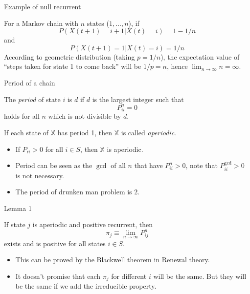 \documentclass[mathserif]{beamer}
\begin{document}
\begin{frame}{Example of null recurrent}
	\begin{example}
		For a Markov chain with $n$ states ($1,\ldots,n$), if 
		\[
		P(X(t+1)=i+1|X(t)=i) = 1-1/n
		\]
		and
		\[
		P(X(t+1)=1|X(t)=i) = 1/n
		\]
		According to geometric distribution (taking $p = 1/n$), the expectation value of ``steps taken for state 1 to come back'' will be $1/p = n$, hence $\lim_{n\to\infty} n = \infty$.
	\end{example}
\end{frame}

\begin{frame}{Period of a chain}
	\begin{definition}
		The \textit{period} of state $i$ is $d$ if $d$ is the largest integer such that
		\[
		P^n_{ii} = 0
		\]
		holds for all $n$ which is not divisible by $d$.
	\end{definition}
	\begin{definition}
		If each state of $\mathbb{X}$ has period 1, then $\mathbb{X}$ is called \textit{aperiodic}.
	\end{definition}
	\begin{itemize}
		\item If $P_{ii} > 0$ for all $i \in S$, then $\mathbb{X}$ is aperiodic.
		\item Period can be seen as the $\gcd$ of all $n$ that have $P^n_{ii} > 0$, note that $P^{\gcd}_{ii} > 0$ is not necessary.
		\item The period of drunken man problem is 2.
	\end{itemize}
\end{frame}

\begin{frame}{Lemma 1}
	\begin{lemma}
		If state $j$ is aperiodic and positive recurrent, then
		\[
		\pi_j \equiv \lim_{n \to \infty} P^n_{ij}
		\]
		exists and is positive for all states $i \in S$.
	\end{lemma}
	\begin{itemize}
		\item This can be proved by the Blackwell theorem in Renewal theory.
		\item It doesn't promise that each $\pi_j$ for different $i$ will be the same.
			But they will be the same if we add the irreducible property.
	\end{itemize}
\end{frame}
\end{document}
